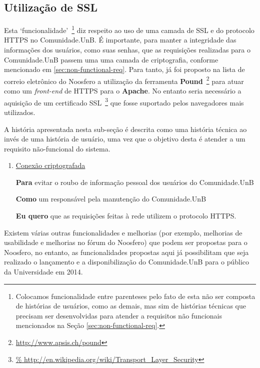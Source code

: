\subsection{Utilização de SSL}

Esta `funcionalidade'~\footnote{Colocamos funcionalidade entre parenteses pelo
fato de esta não ser composta de histórias de usuários, como as demais, mas sim
de histórias técnicas que precisam ser desenvolvidas para atender a requisitos
não funcionais mencionados na Seção \ref{sec:non-functional-req}.} diz respeito
ao uso de uma camada de SSL e do protocolo HTTPS no Comunidade.UnB.
%
É importante, para manter a integridade das informações
dos usuários, como suas senhas, que as requisições realizadas para o
Comunidade.UnB passem uma uma camada de criptografia, conforme mencionado em
\ref{sec:non-functional-req}.
%
Para tanto, já foi proposto na lista de correio eletrônico do Noosfero a
utilização da ferramenta \textbf{Pound}~\footnote{\url{http://www.apsis.ch/pound}}
para atuar como um \textit{front-end} de HTTPS para o \textbf{Apache}.
%
No entanto seria necessário a aquisição de um certificado SSL~\footnote{\url{%
http://en.wikipedia.org/wiki/Transport_Layer_Security}} que fosse suportado
pelos navegadores mais utilizados.

A história apresentada nesta sub-seção é descrita como uma história técnica ao
invés de uma história de usuário, uma vez que o objetivo desta é atender a
um requisito não-funcional do sistema.

\begin{enumerate}


\item \underline{Conexão criptografada}

	\textbf{Para} evitar o roubo de informação pessoal dos usuários do
Comunidade.UnB

	\textbf{Como} um responsável pela manutenção do Comunidade.UnB

	\textbf{Eu quero} que as requisições feitas à rede utilizem o protocolo
HTTPS.


\end{enumerate}

Existem várias outras funcionalidades e melhorias (por exemplo, melhorias de
usabilidade e melhorias no fórum do Noosfero) que podem ser propostas para
o Noosfero, no entanto, as funcionalidades propostas aqui já possibilitam que
seja realizado o lançamento e a disponibilização do Comunidade.UnB para o
público da Universidade em 2014.
